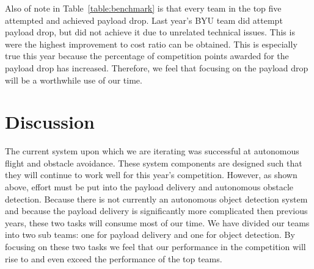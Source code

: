 \documentclass[]{auvsi_doc}
\begin{document}
Also of note in Table~\ref{table:benchmark} is that every team in the top five attempted and achieved payload drop. Last year's BYU team did attempt payload drop, but did not achieve it due to unrelated technical issues. This is were the highest improvement to cost ratio can be obtained. This is especially true this year because the percentage of competition points awarded for the payload drop has increased. Therefore, we feel that focusing on the payload drop will be a worthwhile use of our time.

\section{Discussion}

The current system upon which we are iterating was successful at autonomous flight and obstacle avoidance. These system components are designed such that they will continue to work well for this year's competition. However, as shown above, effort must be put into the payload delivery and autonomous obstacle detection. Because there is not currently an autonomous object detection system and because the payload delivery is significantly more complicated then previous years, these two tasks will consume most of our time. We have divided our teams into two sub teams: one for payload delivery and one for object detection. By focusing on these two tasks we feel that our performance in the competition will rise to and even exceed the performance of the top teams.
\end{document}

